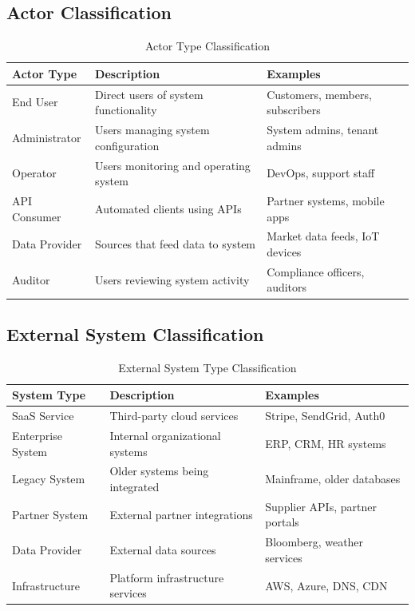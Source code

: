 \documentclass[11pt,letterpaper]{article}
\begin{document}
\subsection{Actor Classification}

\begin{table}[H]
\centering
\caption{Actor Type Classification}
\small
\begin{tabular}{@{}L{2.5cm}L{4cm}L{6.5cm}@{}}
\toprule
\textbf{Actor Type} & \textbf{Description} & \textbf{Examples} \\
\midrule
End User & Direct users of system functionality & Customers, members, subscribers \\
\addlinespace
Administrator & Users managing system configuration & System admins, tenant admins \\
\addlinespace
Operator & Users monitoring and operating system & DevOps, support staff \\
\addlinespace
API Consumer & Automated clients using APIs & Partner systems, mobile apps \\
\addlinespace
Data Provider & Sources that feed data to system & Market data feeds, IoT devices \\
\addlinespace
Auditor & Users reviewing system activity & Compliance officers, auditors \\
\bottomrule
\end{tabular}
\end{table}

\subsection{External System Classification}

\begin{table}[H]
\centering
\caption{External System Type Classification}
\small
\begin{tabular}{@{}L{2.5cm}L{4cm}L{6.5cm}@{}}
\toprule
\textbf{System Type} & \textbf{Description} & \textbf{Examples} \\
\midrule
SaaS Service & Third-party cloud services & Stripe, SendGrid, Auth0 \\
\addlinespace
Enterprise System & Internal organizational systems & ERP, CRM, HR systems \\
\addlinespace
Legacy System & Older systems being integrated & Mainframe, older databases \\
\addlinespace
Partner System & External partner integrations & Supplier APIs, partner portals \\
\addlinespace
Data Provider & External data sources & Bloomberg, weather services \\
\addlinespace
Infrastructure & Platform infrastructure services & AWS, Azure, DNS, CDN \\
\bottomrule
\end{tabular}
\end{table}
\end{document}
